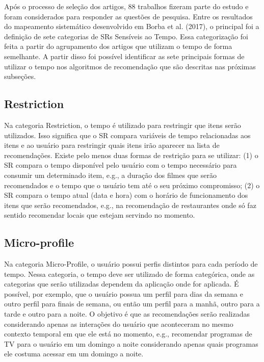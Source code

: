 Após o processo de seleção dos artigos, 88 trabalhos fizeram parte do estudo e foram considerados para responder as questões de pesquisa. Entre os resultados do mapeamento sistemático desenvolvido em Borba et al. (2017), o principal foi a definição de sete categorias de SRs Sensíveis ao Tempo. Essa categorização foi feita a partir do agrupamento dos artigos que utilizam o tempo de forma semelhante. A partir disso foi possível identificar as sete principais formas de utilizar o tempo nos algoritmos de recomendação que são descritas nas próximas subseções.

\subsection{Restriction}

Na categoria Restriction, o tempo é utilizado para restringir que itens serão utilizados. Isso significa que o SR compara variáveis de tempo relacionadas aos itens e ao usuário para restringir quais itens irão aparecer na lista de recomendações. Existe pelo menos duas formas de restrição para se utilizar: (1) o SR compara o tempo disponível pelo usuário com o tempo necessário para consumir um determinado item, e.g., a duração dos filmes que serão recomendados e o tempo que o usuário tem até o seu próximo compromisso; (2) o SR compara o tempo atual (data e hora) com o horário de funcionamento dos itens que serão recomendados, e.g., na recomendação de restaurantes onde só faz sentido recomendar locais que estejam servindo no momento.

\subsection{Micro-profile}

Na categoria Micro-Profile, o usuário possui perfis distintos para cada período de tempo. Nessa categoria, o tempo deve ser utilizado de forma categórica, onde as categorias que serão utilizadas dependem da aplicação onde for aplicada. É possível, por exemplo, que o usuário possua um perfil para dias da semana e outro perfil para finais de semana, ou então um perfil para a manhã, outro para a tarde e outro para a noite. O objetivo é que as recomendações serão realizadas considerando apenas as interações do usuário que aconteceram no mesmo contexto temporal em que ele está no momento, e.g., recomendar programas de TV para o usuário em um domingo a noite considerando apenas quais programas ele costuma acessar em um domingo a noite.

